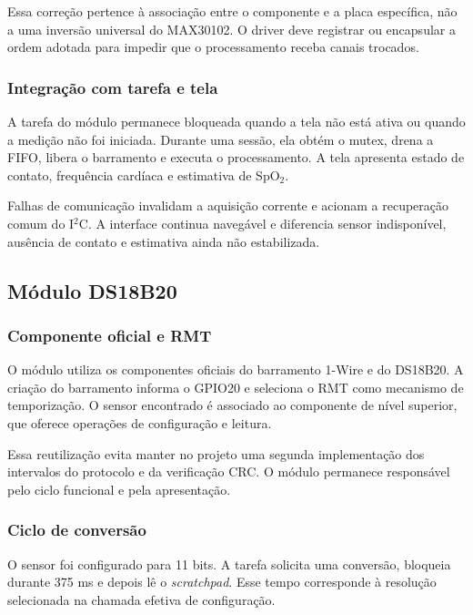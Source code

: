 \documentclass[a4paper,12pt]{article}
\begin{document}
Essa corre\c{c}\~ao pertence \`a associa\c{c}\~ao entre o componente e a placa espec\'ifica, n\~ao a uma invers\~ao universal do MAX30102. O driver deve registrar ou encapsular a ordem adotada para impedir que o processamento receba canais trocados.


\subsubsection{Integra\c{c}\~ao com tarefa e tela}


A tarefa do m\'odulo permanece bloqueada quando a tela n\~ao est\'a ativa ou quando a medi\c{c}\~ao n\~ao foi iniciada. Durante uma sess\~ao, ela obt\'em o mutex, drena a FIFO, libera o barramento e executa o processamento. A tela apresenta estado de contato, frequ\^encia card\'iaca e estimativa de SpO$_2$.


Falhas de comunica\c{c}\~ao invalidam a aquisi\c{c}\~ao corrente e acionam a recupera\c{c}\~ao comum do I$^2$C. A interface continua naveg\'avel e diferencia sensor indispon\'ivel, aus\^encia de contato e estimativa ainda n\~ao estabilizada.


\subsection{M\'odulo DS18B20}


\subsubsection{Componente oficial e RMT}


O m\'odulo utiliza os componentes oficiais do barramento 1-Wire e do DS18B20. A cria\c{c}\~ao do barramento informa o GPIO20 e seleciona o RMT como mecanismo de temporiza\c{c}\~ao. O sensor encontrado \'e associado ao componente de n\'ivel superior, que oferece opera\c{c}\~oes de configura\c{c}\~ao e leitura.


Essa reutiliza\c{c}\~ao evita manter no projeto uma segunda implementa\c{c}\~ao dos intervalos do protocolo e da verifica\c{c}\~ao CRC. O m\'odulo permanece respons\'avel pelo ciclo funcional e pela apresenta\c{c}\~ao.


\subsubsection{Ciclo de convers\~ao}


O sensor foi configurado para 11 bits. A tarefa solicita uma convers\~ao, bloqueia durante 375 ms e depois l\^e o \emph{scratchpad}. Esse tempo corresponde \`a resolu\c{c}\~ao selecionada na chamada efetiva de configura\c{c}\~ao.
\end{document}
